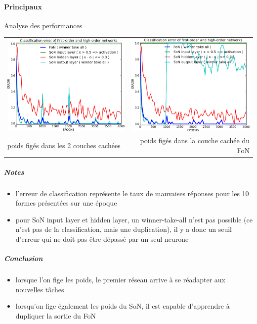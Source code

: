     \paragraph{Principaux}
      Analyse des performances
      \begin{center}
	\begin{tabular}{lr}
	  \hspace*{-1cm}
	  \includegraphics[width=250px]{data/expB4/err_bb.png}
	  &
	  \includegraphics[width=250px]{data/expB4/err_block.png} \\
	  poids figés dans les 2 couches cachées
	  &
	  poids figés dans la couche cachée du FoN
	\end{tabular}
      \end{center}
      \subparagraph{Notes}
	\begin{itemize}
	  \item l'erreur de classification représente le taux de mauvaises réponses pour les 10 formes présentées sur une époque
	  \item pour SoN input layer et hidden layer, un winner-take-all n'est pas possible (ce n'est pas de la classification, 
	  mais une duplication), il y a donc un seuil d'erreur qui ne doit pas être dépassé par un seul neurone
	\end{itemize}
      \subparagraph{Conclusion}
	\begin{itemize}
	  \item lorsque l'on fige les poids, le premier réseau arrive à se réadapter aux nouvelles tâches
	  \item lorsqu'on fige également les poids du SoN, il est capable d'apprendre à dupliquer la sortie
	  du FoN
	  
	\end{itemize}
